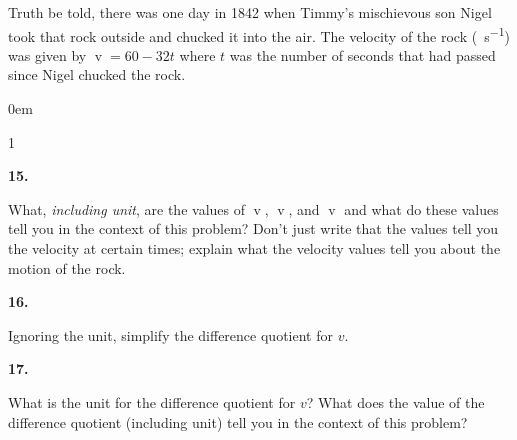 \documentclass[12pt,]{book}
\theoremstyle{plain}
\theoremstyle{definition}
\numberwithin{equation}{section}
\newenvironment{exercisegroup}%
{\medskip\noindent}%
{\par\bigskip}%
\newlength{\exercisegroupindent}%
\newlength{\exercisegroupitemwidth}%
\newenvironment{exercisegrouplist}%
{\vspace{-\partopsep}%
\begin{adjustwidth}{\exercisegroupindent}{0em}}%
{\end{adjustwidth}%
\vspace{-\partopsep}%
\vspace{\baselineskip}}%
\newenvironment{exercisegroupbycol}[1]%
{\begin{exercisegrouplist}%
\vspace{-\multicolsep}%
\begin{multicols}{#1}%
\setlength{\parindent}{0em}%
\setlength{\exercisegroupitemwidth}{\linewidth}}%
{\end{multicols}%
\vspace{-\multicolsep}%
\end{exercisegrouplist}}%
\newenvironment{exercisegroupitem}[1]%
{\begin{minipage}[t]{\exercisegroupitemwidth}
\vspace{0pt}%
{\bfseries#1}%
\rule{0pt}{\baselineskip}}{\strut%
\end{minipage}%
\hspace{\columnsep}}%
\providecommand\phantomsection{}
\newcommand{\fe}[2]{\mathop{{#1}{\left(#2\right)}}}
\begin{document}
\begin{exercisegroup}%
Truth be told, there was one day in 1842 when Timmy's mischievous son Nigel took that rock outside and chucked it into the air. The velocity of the rock (\si{\foot\per\second}) was given by \(\fe{v}{t}=60-32t\) where \(t\) was the number of seconds that had passed since Nigel chucked the rock.%
\par
\begin{exercisegroupbycol}{1}%
\begin{exercisegroupitem}{15. }\phantomsection\hypertarget{exercise-23}{\null}
What, \emph{including unit}, are the values of \(\fe{v}{0}\), \(\fe{v}{1}\), and \(\fe{v}{2}\) and what do these values tell you in the context of this problem? Don't just write that the values tell you the velocity at certain times; explain what the velocity values tell you about the motion of the rock.%
\end{exercisegroupitem}%
\par%
\begin{exercisegroupitem}{16. }\phantomsection\hypertarget{exercise-24}{\null}
Ignoring the unit, simplify the difference quotient for \(v\).%
\end{exercisegroupitem}%
\par%
\begin{exercisegroupitem}{17. }\phantomsection\hypertarget{exercise-25}{\null}
 What is the unit for the difference quotient for \(v\)? What does the value of the difference quotient (including unit) tell you in the context of this problem?%
\end{exercisegroupitem}%
\par%
\end{exercisegroupbycol}%
\end{exercisegroup}%
\end{document}
